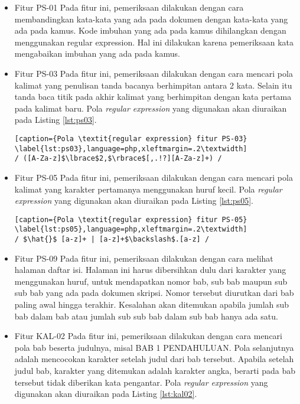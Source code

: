 \begin{itemize}
	\item Fitur PS-01 \newline
	Pada fitur ini, pemeriksaan dilakukan dengan cara membandingkan kata-kata yang ada pada dokumen dengan kata-kata yang ada pada kamus. Kode imbuhan yang ada pada kamus dihilangkan dengan menggunakan regular expression. Hal ini dilakukan karena pemeriksaan kata mengabaikan imbuhan yang ada pada kamus.
	
	\item Fitur PS-03 \newline
	Pada fitur ini, pemeriksaan dilakukan dengan cara mencari pola kalimat yang penulisan tanda bacanya berhimpitan antara 2 kata. Selain itu tanda baca titik pada akhir kalimat yang berhimpitan dengan kata pertama pada kalimat baru. Pola \textit{regular expression} yang digunakan akan diuraikan pada Listing \ref{lst:ps03}.
	
\begin{lstlisting}[caption={Pola \textit{regular expression} fitur PS-03}	\label{lst:ps03},language=php,xleftmargin=.2\textwidth]
/ ([A-Za-z]$\lbrace$2,$\rbrace$[,.!?][A-Za-z]+) /
\end{lstlisting}
\medskip

	\item Fitur PS-05 \newline
	Pada fitur ini, pemeriksaan dilakukan dengan cara mencari pola kalimat yang karakter pertamanya menggunakan huruf kecil. Pola \textit{regular expression} yang digunakan akan diuraikan pada Listing \ref{lst:ps05}.
	
\begin{lstlisting}[caption={Pola \textit{regular expression} fitur PS-05}	\label{lst:ps05},language=php,xleftmargin=.2\textwidth]
/ $\hat{}$ [a-z]+ | [a-z]+$\backslash$.[a-z] /	
\end{lstlisting}	
\medskip
	
	\item Fitur PS-09 \newline
	Pada fitur ini, pemeriksaan dilakukan dengan cara melihat halaman daftar isi. Halaman ini harus dibersihkan dulu dari karakter yang menggunakan huruf, untuk mendapatkan nomor bab, sub bab maupun sub sub bab yang ada pada dokumen skripsi. Nomor tersebut diurutkan dari bab paling awal hingga terakhir. Kesalahan akan  ditemukan apabila jumlah sub bab dalam bab atau jumlah sub sub bab dalam sub bab hanya ada satu.
	
	\item Fitur KAL-02 \newline
	Pada fitur ini, pemeriksaan dilakukan dengan cara mencari pola bab beserta judulnya, misal BAB 1 PENDAHULUAN. Pola selanjutnya adalah mencocokan karakter setelah judul dari bab tersebut. Apabila setelah judul bab, karakter yang ditemukan adalah karakter angka, berarti pada bab tersebut tidak diberikan kata pengantar. Pola \textit{regular expression} yang digunakan akan diuraikan pada Listing \ref{lst:kal02}.
	

\end{itemize}
